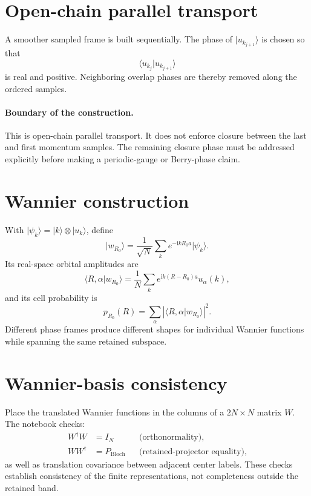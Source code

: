 \documentclass[11pt]{article}
\newcommand{\ii}{\mathrm i}
\newcommand{\ket}[1]{\lvert #1\rangle}
\newcommand{\braket}[2]{\langle #1\vert #2\rangle}
\begin{document}
\section{Open-chain parallel transport}

A smoother sampled frame is built sequentially. The phase of
$\ket{u_{k_{j+1}}}$ is chosen so that
\begin{equation}
 \braket{u_{k_j}}{u_{k_{j+1}}}
\end{equation}
is real and positive. Neighboring overlap phases are thereby removed along the
ordered samples.

\paragraph{Boundary of the construction.}
This is open-chain parallel transport. It does not enforce closure between the
last and first momentum samples. The remaining closure phase must be addressed
explicitly before making a periodic-gauge or Berry-phase claim.

\section{Wannier construction}

With $\ket{\psi_k}=\ket{k}\otimes\ket{u_k}$, define
\begin{equation}
 \ket{w_{R_0}}=\frac{1}{\sqrt N}\sum_k
 e^{-\ii kR_0a}\ket{\psi_k}.
\end{equation}
Its real-space orbital amplitudes are
\begin{equation}
 \braket{R,\alpha}{w_{R_0}}
 =\frac1N\sum_k e^{\ii k(R-R_0)a}u_\alpha(k),
\end{equation}
and its cell probability is
\begin{equation}
 p_{R_0}(R)=\sum_\alpha
 \left|\braket{R,\alpha}{w_{R_0}}\right|^2.
\end{equation}
Different phase frames produce different shapes for individual Wannier
functions while spanning the same retained subspace.

\section{Wannier-basis consistency}

Place the translated Wannier functions in the columns of a $2N\times N$ matrix
$W$. The notebook checks:
\begin{align}
 W^\dagger W &= I_N &&\text{(orthonormality)},\\
 WW^\dagger &= P_{\mathrm{Bloch}} &&\text{(retained-projector equality)},
\end{align}
as well as translation covariance between adjacent center labels. These checks
establish consistency of the finite representations, not completeness outside
the retained band.
\end{document}
